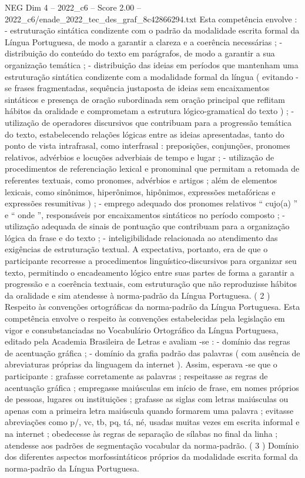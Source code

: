 \begin{textsample}{NEG Dim 4 – 2022\_c6 – Score 2.00 – 2022\_c6/enade\_2022\_tec\_des\_graf\_8c42866294.txt}
Esta competência envolve : - estruturação sintática condizente com o padrão da modalidade escrita formal da Língua Portuguesa, de modo a garantir a clareza e a coerência necessárias ; - distribuição do conteúdo do texto em parágrafos, de modo a garantir a sua organização temática ; - distribuição das ideias em períodos que mantenham uma estruturação sintática condizente com a modalidade formal da língua ( evitando -se frases fragmentadas, sequência justaposta de ideias sem encaixamentos sintáticos e presença de oração subordinada sem oração principal que reflitam hábitos da oralidade e comprometam a estrutura lógico-gramatical do texto ) ; - utilização de operadores discursivos que contribuam para a progressão temática do texto, estabelecendo relações lógicas entre as ideias apresentadas, tanto do ponto de vista intrafrasal, como interfrasal : preposições, conjunções, pronomes relativos, advérbios e locuções adverbiais de tempo e lugar ; - utilização de procedimentos de referenciação lexical e pronominal que permitam a retomada de referentes textuais, como pronomes, advérbios e artigos ; além de elementos lexicais, como sinônimos, hiperônimos, hipônimos, expressões metafóricas e expressões resumitivas ) ; - emprego adequado dos pronomes relativos “ cujo(a) ” e “ onde ”, responsáveis por encaixamentos sintáticos no período composto ; - utilização adequada de sinais de pontuação que contribuam para a organização lógica da frase e do texto ; - inteligibilidade relacionada ao atendimento das exigências de estruturação textual.
A expectativa, portanto, era de que o participante recorresse a procedimentos linguístico-discursivos para organizar seu texto, permitindo o encadeamento lógico entre suas partes de forma a garantir a progressão e a coerência textuais, com estruturação que não reproduzisse hábitos da oralidade e sim atendesse à norma-padrão da Língua Portuguesa. ( 2 ) Respeito às convenções ortográficas da norma-padrão da Língua Portuguesa.
Esta competência envolve o respeito às convenções estabelecidas pela legislação em vigor e consubstanciadas no Vocabulário Ortográfico da Língua Portuguesa, editado pela Academia Brasileira de Letras e avaliam -se : - domínio das regras de acentuação gráfica ; - domínio da grafia padrão das palavras ( com ausência de abreviaturas próprias da linguagem da internet ).
Assim, esperava -se que o participante : grafasse corretamente as palavras ; respeitasse as regras de acentuação gráfica ; empregasse maiúsculas em início de frase, em nomes próprios de pessoas, lugares ou instituições ; grafasse as siglas com letras maiúsculas ou apenas com a primeira letra maiúscula quando formarem uma palavra ; evitasse abreviações como p/, vc, tb, pq, tá, né, usadas muitas vezes em escrita informal e na internet ; obedecesse às regras de separação de sílabas no final da linha ; atendesse aos padrões de segmentação vocabular da norma-padrão. ( 3 ) Domínio dos diferentes aspectos morfossintáticos próprios da modalidade escrita formal da norma-padrão da Língua Portuguesa.

\end{textsample}
